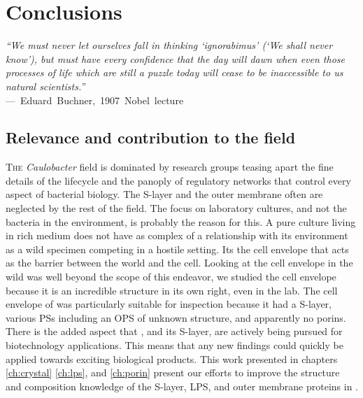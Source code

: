 
\acresetall
\resetlinenumber[1]
\chapter{Conclusions}
\label{ch:conclusions}
\begin{epigraph}
  \emph{``We must never let ourselves fall in thinking `ignorabimus' (`We shall never know'), but must have every confidence that the day will dawn when even those processes of life which are still a puzzle today will cease to be inaccessible to us natural scientists.''}\\ ---~Eduard~Buchner,~1907~Nobel~lecture 
\end{epigraph}
\section{Relevance and contribution to the field}\label{sec:relev-contr-field} 

\lettrine[lines=2]{T}{he} \textit{Caulobacter} field is dominated by research groups teasing apart the fine details of the \caulobacter{} lifecycle and the panoply of regulatory networks that control every aspect of bacterial biology. The \ac{S-layer}
 and the outer membrane often are neglected by the rest of the field. The focus on laboratory cultures, and not the bacteria in the environment, is probably the reason for this. A pure culture living in rich medium does not have as complex of a relationship with its environment as a wild specimen competing in a hostile setting. Its the cell envelope that acts as the barrier between the world and the cell. Looking at the \caulobacter cell envelope in the wild was well beyond the scope of this endeavor, we studied the cell envelope because it is an incredible structure in its own right, even in the lab. The cell envelope of \caulobacter{} was particularly suitable for inspection because it had a \acl{S-layer}, various \aclp{PS} including an \ac{OPS} of unknown structure, and apparently no porins. There is the added aspect that \caulobacter{}, and its \ac{S-layer}, are actively being pursued for biotechnology applications. This means that any new findings could quickly be applied towards exciting biological products. This work presented in chapters \ref{ch:crystal} \ref{ch:lps}, and \ref{ch:porin} present our efforts to improve the structure and composition knowledge of the \ac{S-layer}, \ac{LPS}, and outer membrane proteins in \caulobacter{}.
 
